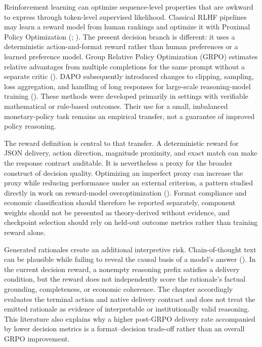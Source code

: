 Reinforcement learning can optimize sequence-level properties that are awkward
to express through token-level supervised likelihood. Classical RLHF pipelines
may learn a reward model from human rankings and optimize it with Proximal
Policy Optimization (\cite{ouyang2022training};
\cite{schulman2017proximal}). The present decision branch is different: it
uses a deterministic action-and-format reward rather than human preferences or
a learned preference model. Group Relative Policy Optimization (GRPO)
estimates relative advantages from multiple completions for the same prompt
without a separate critic (\cite{shao2024deepseekmath}). DAPO subsequently
introduced changes to clipping, sampling, loss aggregation, and handling of
long responses for large-scale reasoning-model training
(\cite{yu2025dapo}). These methods were developed primarily in settings with
verifiable mathematical or rule-based outcomes. Their use for a small,
imbalanced monetary-policy task remains an empirical transfer, not a guarantee
of improved policy reasoning.

The reward definition is central to that transfer. A deterministic reward for
JSON delivery, action direction, magnitude proximity, and exact match can make
the response contract auditable. It is nevertheless a proxy for the broader
construct of decision quality. Optimizing an imperfect proxy can increase the
proxy while reducing performance under an external criterion, a pattern
studied directly in work on reward-model overoptimization
(\cite{gao2023reward}). Format compliance and economic classification should
therefore be reported separately, component weights should not be presented as
theory-derived without evidence, and checkpoint selection should rely on
held-out outcome metrics rather than training reward alone.

Generated rationales create an additional interpretive risk. Chain-of-thought
text can be plausible while failing to reveal the causal basis of a model's
answer (\cite{turpin2023unfaithful}). In the current decision reward, a
nonempty reasoning prefix satisfies a delivery condition, but the reward does
not independently score the rationale's factual grounding, completeness, or
economic coherence. The chapter accordingly evaluates the terminal action
and native delivery contract and does not treat the emitted rationale as
evidence of interpretable or institutionally valid reasoning. This literature
also explains why a higher post-GRPO delivery rate accompanied by lower
decision metrics is a format--decision trade-off rather than an overall GRPO
improvement.

